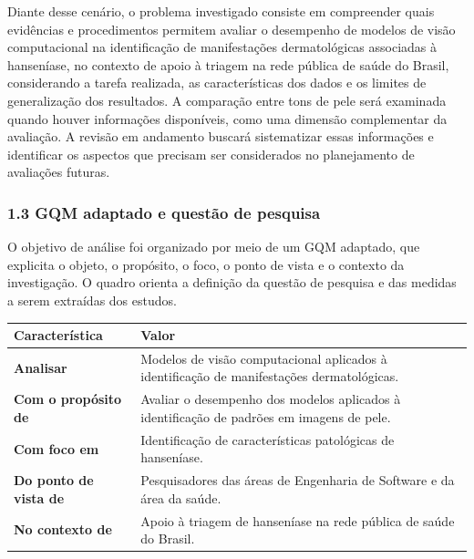 \documentclass[
]{article}
\newcounter{none} %
\begin{document}
Diante desse cenário, o problema investigado consiste em compreender
quais evidências e procedimentos permitem avaliar o desempenho de
modelos de visão computacional na identificação de manifestações
dermatológicas associadas à hanseníase, no contexto de apoio à triagem
na rede pública de saúde do Brasil, considerando a tarefa realizada, as
características dos dados e os limites de generalização dos resultados.
A comparação entre tons de pele será examinada quando houver informações
disponíveis, como uma dimensão complementar da avaliação. A revisão em
andamento buscará sistematizar essas informações e identificar os
aspectos que precisam ser considerados no planejamento de avaliações
futuras.

\subsubsection{1.3 GQM adaptado e questão de
pesquisa}\label{gqm-adaptado-e-questuxe3o-de-pesquisa}

O objetivo de análise foi organizado por meio de um GQM adaptado, que
explicita o objeto, o propósito, o foco, o ponto de vista e o contexto
da investigação. O quadro orienta a definição da questão de pesquisa e
das medidas a serem extraídas dos estudos.

{\def\LTcaptype{none} %
\begin{longtable}[]{@{}
  >{\raggedright\arraybackslash}p{}
  >{\raggedright\arraybackslash}p{}@{}}
\toprule\noalign{}
\begin{minipage}[b]{\linewidth}\raggedright
Característica
\end{minipage} & \begin{minipage}[b]{\linewidth}\raggedright
Valor
\end{minipage} \\
\midrule\noalign{}
\endhead
\bottomrule\noalign{}
\endlastfoot
\textbf{Analisar} & Modelos de visão computacional aplicados à
identificação de manifestações dermatológicas. \\
\textbf{Com o propósito de} & Avaliar o desempenho dos modelos aplicados
à identificação de padrões em imagens de pele. \\
\textbf{Com foco em} & Identificação de características patológicas de
hanseníase. \\
\textbf{Do ponto de vista de} & Pesquisadores das áreas de Engenharia de
Software e da área da saúde. \\
\textbf{No contexto de} & Apoio à triagem de hanseníase na rede pública
de saúde do Brasil. \\
\end{longtable}
}
\end{document}
